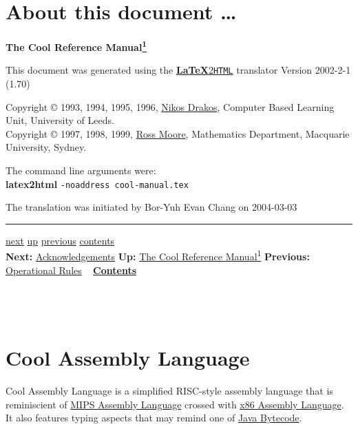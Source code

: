 \documentclass[]{article}
\begin{document}
\section{About this document \ldots{}}

\textbf{The Cool Reference
Manual\href{footnode.html\#foot266}{\textsuperscript{1}}}

This document was generated using the
\href{http://www.latex2html.org/}{\textbf{LaTeX}2\texttt{HTML}}
translator Version 2002-2-1 (1.70)

Copyright © 1993, 1994, 1995, 1996,
\href{http://cbl.leeds.ac.uk/nikos/personal.html}{Nikos Drakos},
Computer Based Learning Unit, University of Leeds. \\ Copyright © 1997,
1998, 1999, \href{http://www.maths.mq.edu.au/~ross/}{Ross Moore},
Mathematics Department, Macquarie University, Sydney.

The command line arguments were: \\ \textbf{latex2html}
\texttt{-noaddress cool-manual.tex}

The translation was initiated by Bor-Yuh Evan Chang on 2004-03-03 \\

\begin{center}\rule{3in}{0.4pt}\end{center}

\href{node33.html}{next} \href{cool-manual.html}{up}
\href{node31.html}{previous} \href{node1.html}{contents} \\
\textbf{Next:} \href{node49.html}{Acknowledgements} \textbf{Up:}
\href{cool-manual.html}{The Cool Reference Manual\textsuperscript{1}}
\textbf{Previous:} \href{node48.html}{Operational Rules} ~
\textbf{\href{node1.html}{Contents}} \\ \\

\section{\\ Cool Assembly Language}

Cool Assembly Language is a simplified RISC-style assembly language that
is reminiscient of
\href{http://en.wikipedia.org/wiki/MIPS_architecture\#MIPS_assembly_language}{MIPS
Assembly Language} crossed with
\href{http://en.wikipedia.org/wiki/X86_assembly_language}{x86 Assembly
Language}. It also features typing aspects that may remind one of
\href{http://en.wikipedia.org/wiki/Java_bytecode}{Java Bytecode}.
\end{document}
